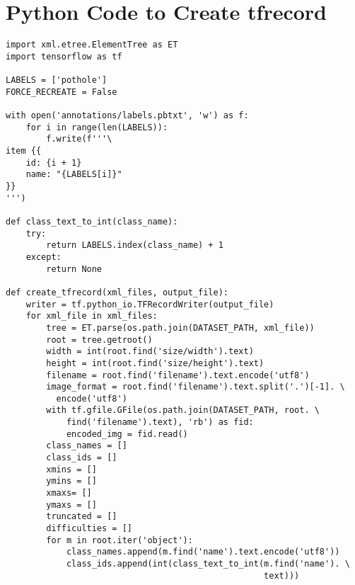     \section{Python Code to Create tfrecord}\label{app:mk_tfrecord}
        \begin{verbatim}
import xml.etree.ElementTree as ET
import tensorflow as tf

LABELS = ['pothole']
FORCE_RECREATE = False

with open('annotations/labels.pbtxt', 'w') as f:
    for i in range(len(LABELS)):
        f.write(f'''\
item {{
    id: {i + 1}
    name: "{LABELS[i]}"
}}
''')

def class_text_to_int(class_name):
    try:
        return LABELS.index(class_name) + 1
    except:
        return None

def create_tfrecord(xml_files, output_file):
    writer = tf.python_io.TFRecordWriter(output_file)
    for xml_file in xml_files:
        tree = ET.parse(os.path.join(DATASET_PATH, xml_file))
        root = tree.getroot()
        width = int(root.find('size/width').text)
        height = int(root.find('size/height').text)
        filename = root.find('filename').text.encode('utf8')
        image_format = root.find('filename').text.split('.')[-1]. \
          encode('utf8')
        with tf.gfile.GFile(os.path.join(DATASET_PATH, root. \
            find('filename').text), 'rb') as fid:
            encoded_img = fid.read()
        class_names = []
        class_ids = []
        xmins = []
        ymins = []
        xmaxs= []
        ymaxs = []
        truncated = []
        difficulties = []
        for m in root.iter('object'):
            class_names.append(m.find('name').text.encode('utf8'))
            class_ids.append(int(class_text_to_int(m.find('name'). \
                                                   text)))
                                                   

\end{verbatim}
